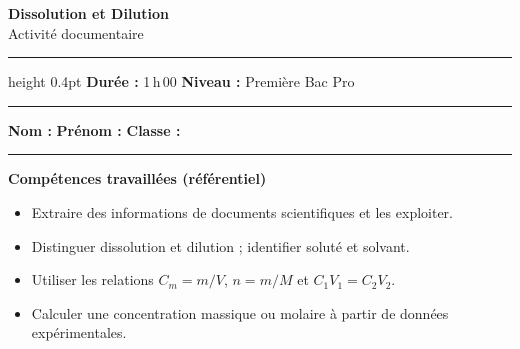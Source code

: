 \documentclass[12pt,a4paper]{article}
\begin{document}

\begin{tcolorbox}[
  colback=white, colframe=bluedark, boxrule=1.5pt, arc=4pt,
  before skip=0pt, after skip=8pt,
  left=10pt, right=10pt, top=8pt, bottom=8pt,
]
  \begin{center}
    {\color{bluedark}\Large\bfseries Dissolution et Dilution}\\[4pt]
    {\large Activité documentaire}\\[6pt]
    \hrule height 0.4pt \vspace{6pt}
    \textbf{Durée :} 1\,h\,00 \hfill \textbf{Niveau :} Première Bac Pro
  \end{center}
\end{tcolorbox}

\vspace{2pt}
\noindent\rule{\linewidth}{0.5pt}
\vspace{4pt}

\noindent\textbf{Nom :} \dotfill \hspace{1cm} \textbf{Prénom :} \dotfill \hspace{1cm} \textbf{Classe :} \dotfill

\vspace{2pt}
\noindent\rule{\linewidth}{0.5pt}
\vspace{6pt}

\begin{tcolorbox}[styleinfo]
  \textbf{\color{bluedark}Compétences travaillées (référentiel)}
  \begin{itemize}[noitemsep, leftmargin=1.2em]
    \item Extraire des informations de documents scientifiques et les exploiter.
    \item Distinguer dissolution et dilution ; identifier soluté et solvant.
    \item Utiliser les relations $C_m = m/V$, $n = m/M$ et $C_1 V_1 = C_2 V_2$.
    \item Calculer une concentration massique ou molaire à partir de données expérimentales.
  \end{itemize}
\end{tcolorbox}
\end{document}
